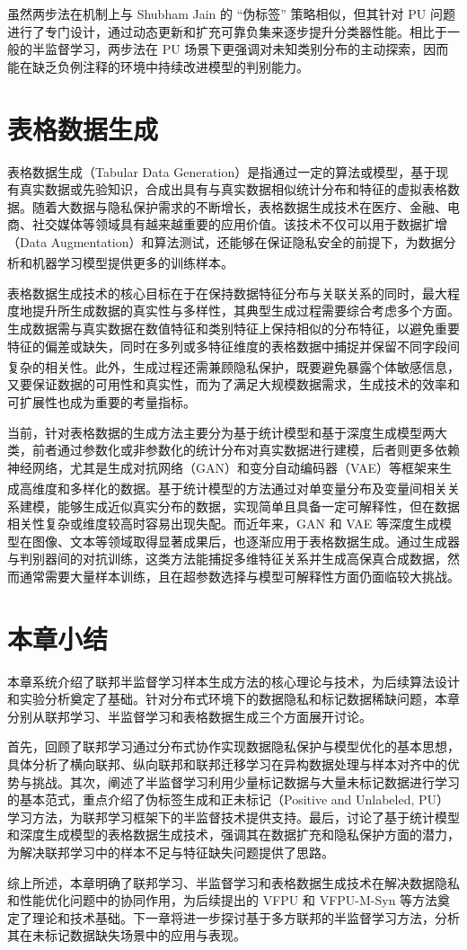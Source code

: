 虽然两步法在机制上与 Shubham Jain 的 “伪标签” 策略相似，但其针对 PU 问题进行了专门设计，通过动态更新和扩充可靠负集来逐步提升分类器性能。相比于一般的半监督学习，两步法在 PU 场景下更强调对未知类别分布的主动探索，因而能在缺乏负例注释的环境中持续改进模型的判别能力。
\section{表格数据生成}
表格数据生成（Tabular Data Generation）是指通过一定的算法或模型，基于现有真实数据或先验知识，合成出具有与真实数据相似统计分布和特征的虚拟表格数据。随着大数据与隐私保护需求的不断增长，表格数据生成技术在医疗、金融、电商、社交媒体等领域具有越来越重要的应用价值。该技术不仅可以用于数据扩增（Data Augmentation）和算法测试，还能够在保证隐私安全的前提下，为数据分析和机器学习模型提供更多的训练样本\textsuperscript{\cite{li2021survey}}。

表格数据生成技术的核心目标在于在保持数据特征分布与关联关系的同时，最大程度地提升所生成数据的真实性与多样性，其典型生成过程需要综合考虑多个方面。生成数据需与真实数据在数值特征和类别特征上保持相似的分布特征，以避免重要特征的偏差或缺失，同时在多列或多特征维度的表格数据中捕捉并保留不同字段间复杂的相关性\textsuperscript{\cite{zhang2020tab}}。此外，生成过程还需兼顾隐私保护，既要避免暴露个体敏感信息，又要保证数据的可用性和真实性，而为了满足大规模数据需求，生成技术的效率和可扩展性也成为重要的考量指标。

当前，针对表格数据的生成方法主要分为基于统计模型和基于深度生成模型两大类，前者通过参数化或非参数化的统计分布对真实数据进行建模，后者则更多依赖神经网络，尤其是生成对抗网络（GAN）和变分自动编码器（VAE）等框架来生成高维度和多样化的数据\textsuperscript{\cite{brown2019differential}}。基于统计模型的方法通过对单变量分布及变量间相关关系建模，能够生成近似真实分布的数据，实现简单且具备一定可解释性，但在数据相关性复杂或维度较高时容易出现失配。而近年来，GAN 和 VAE 等深度生成模型在图像、文本等领域取得显著成果后，也逐渐应用于表格数据生成。通过生成器与判别器间的对抗训练，这类方法能捕捉多维特征关系并生成高保真合成数据，然而通常需要大量样本训练，且在超参数选择与模型可解释性方面仍面临较大挑战。

\section{本章小结}
本章系统介绍了联邦半监督学习样本生成方法的核心理论与技术，为后续算法设计和实验分析奠定了基础。针对分布式环境下的数据隐私和标记数据稀缺问题，本章分别从联邦学习、半监督学习和表格数据生成三个方面展开讨论。

首先，回顾了联邦学习通过分布式协作实现数据隐私保护与模型优化的基本思想，具体分析了横向联邦、纵向联邦和联邦迁移学习在异构数据处理与样本对齐中的优势与挑战。其次，阐述了半监督学习利用少量标记数据与大量未标记数据进行学习的基本范式，重点介绍了伪标签生成和正未标记（Positive and Unlabeled, PU）学习方法，为联邦学习框架下的半监督技术提供支持。最后，讨论了基于统计模型和深度生成模型的表格数据生成技术，强调其在数据扩充和隐私保护方面的潜力，为解决联邦学习中的样本不足与特征缺失问题提供了思路。

综上所述，本章明确了联邦学习、半监督学习和表格数据生成技术在解决数据隐私和性能优化问题中的协同作用，为后续提出的 VFPU 和 VFPU-M-Syn 等方法奠定了理论和技术基础。下一章将进一步探讨基于多方联邦的半监督学习方法，分析其在未标记数据缺失场景中的应用与表现。
